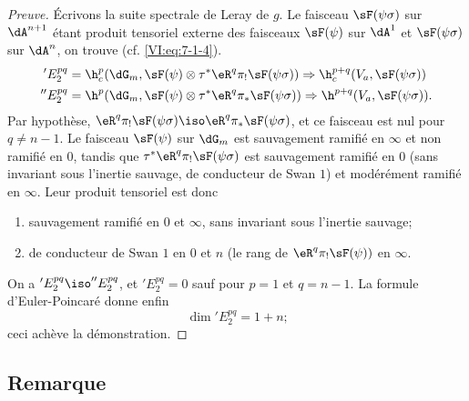 \begin{proof}[Preuve]
Écrivons la suite spectrale de Leray de $g$. Le faisceau $\sF(\psi\sigma)$ sur 
$\dA^{n+1}$ étant produit tensoriel externe des faisceaux $\sF(\psi)$ sur 
$\dA^1$ et $\sF(\psi\sigma)$ sur $\dA^n$, on trouve (cf. \eqref{VI:eq:7-1-4}). 
\begin{align*}
  'E_2^{p q} &= \h_c^p(\dG_m,\sF(\psi)\otimes \tau^\ast \eR^q \pi_! \sF(\psi\sigma)) \Rightarrow \h_c^{p+q}(V_a,\sF(\psi\sigma)) \\
  ''E_2^{p q} &= \h^p(\dG_m,\sF(\psi)\otimes \tau^\ast \eR^q \pi_\ast \sF(\psi\sigma)) \Rightarrow \h^{p+q}(V_a,\sF(\psi\sigma)) \text{.} 
\end{align*}
Par hypothèse, 
$\eR^q \pi_! \sF(\psi\sigma) \iso \eR^q \pi_\ast \sF(\psi\sigma)$, et ce 
faisceau est nul pour $q\ne n-1$. Le faisceau $\sF(\psi)$ sur $\dG_m$ est 
sauvagement ramifié en $\infty$ et non ramifié en $0$, tandis que 
$\tau^\ast \eR^q \pi_! \sF(\psi\sigma)$ est sauvagement ramifié en $0$ (sans 
invariant sous l'inertie sauvage, de conducteur de Swan $1$) et modérément 
ramifié en $\infty$. Leur produit tensoriel est donc 
\begin{enumerate}[\indent a)]
  \item sauvagement ramifié en $0$ et $\infty$, sans invariant sous l'inertie 
    sauvage; 
  \item de conducteur de Swan $1$ en $0$ et $n$ (le rang de 
    $\eR^q \pi_! \sF(\psi))$ en $\infty$. 
\end{enumerate}
On a $'E_2^{p q} \iso ''E_2^{p q}$, et $'E_2^{p q}=0$ sauf pour $p=1$ et 
$q=n-1$. La formule d'Euler-Poincaré donne enfin 
\[
  \dim{'E_2^{p q}} = 1+n \text{;} 
\]
ceci achève la démonstration. 
\end{proof}





\subsection{Remarque}\label{VI:7-15}

